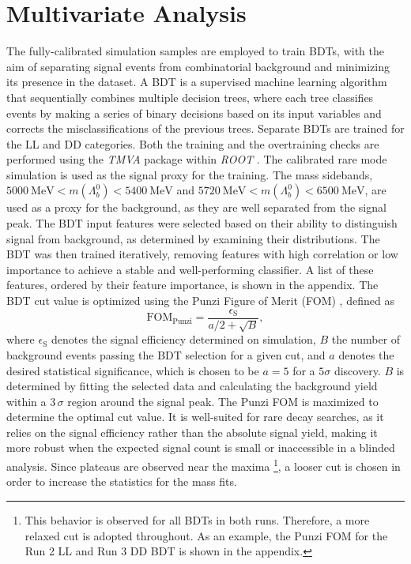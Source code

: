 \section{Multivariate Analysis}
\label{sec:run2_mva}
The fully-calibrated simulation samples are employed to train BDTs, with the aim of separating signal events from combinatorial background and minimizing its presence in the dataset. A BDT is a supervised machine learning algorithm that sequentially combines multiple decision trees, where each tree classifies events by making a series of binary decisions based on its input variables and corrects the misclassifications of the previous trees. Separate BDTs are trained for the LL and DD categories. Both the training and the overtraining checks are performed using the \textit{TMVA} package within \textit{ROOT} \cite{root}. The calibrated rare mode simulation is used as the signal proxy for the training. The mass sidebands, $ \qty{5000}{\mega\electronvolt} < m(\Lambda_b^0) < \qty{5400}{\mega\electronvolt}$ and $\qty{5720}{\mega\electronvolt} < m(\Lambda_b^0) < \qty{6500}{\mega\electronvolt}$, are used as a proxy for the background, as they are well separated from the signal peak. The BDT input features were selected based on their ability to distinguish signal from background, as determined by examining their distributions. The BDT was then trained iteratively, removing features with high correlation or low importance to achieve a stable and well-performing classifier. A list of these features, ordered by their feature importance, is shown in the appendix.  The BDT cut value is optimized using the Punzi Figure of Merit (FOM) \cite{punzi}, defined as
\begin{equation*}
    \text{FOM}_{\text{Punzi}} = \frac{\epsilon_{\text{S}}}{a/2 + \sqrt{B}},
\end{equation*}
where $\epsilon_{\text{S}}$ denotes the signal efficiency determined on simulation, $B$ the number of background events passing the BDT selection for a given cut, and $a$ denotes the desired statistical significance, which is chosen to be $a=5$ for a $5\sigma$ discovery. $B$ is determined by fitting the selected data and calculating the background yield within a $3 \,\sigma$ region around the signal peak. The Punzi FOM is maximized to determine the optimal cut value. It is well-suited for rare decay searches, as it relies on the signal efficiency rather than the absolute signal yield, making it more robust when the expected signal count is small or inaccessible in a blinded analysis. Since plateaus are observed near the maxima \footnote{This behavior is observed for all BDTs in both runs. Therefore, a more relaxed cut is adopted throughout. As an example, the Punzi FOM for the Run 2 LL and Run 3 DD BDT is shown in the appendix.}, a looser cut is chosen in order to increase the statistics for the mass fits.
